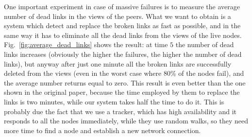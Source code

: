 One important experiment in case of massive failures is to measure the average number of dead links in the views of the peers. What we want to obtain is a system which detect and replace the broken links as fast as possible, and in the same way it has to eliminate all the dead links from the views of the live nodes. Fig.~\ref{fig:average_dead_links} shows the result: at time $5$ the number of dead links increases (obviously the higher the failures, the higher the number of dead links), but anyway after just one minute all the broken links are successfully deleted from the views (even in the worst case where 80\% of the nodes fail), and the average number returns equal to zero. This result is even better than the one shown in the original paper, because the time employed by them to replace the links is two minutes, while our system takes half the time to do it. This is probably due the fact that we use a tracker, which has high availability and it responds to all the nodes immediately, while they use random walks, so they need more time to find a node and establish a new network connection.

